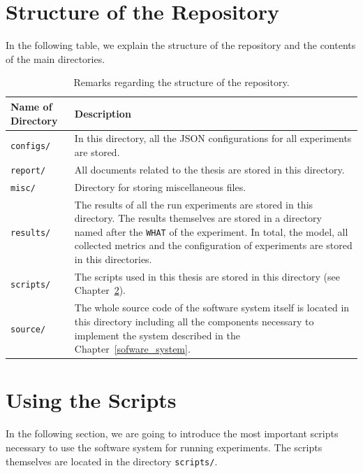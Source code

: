 \clearpage
\section{Structure of the Repository}
In the following table, we explain the structure of the repository and the contents of the main directories.

\begin{table}[H]
	\centering
	\begin{tabularx}{\textwidth}{lX}
		\toprule
		Name of Directory & Description\\ \midrule
		\texttt{configs/} & In this directory, all the JSON configurations for all experiments are stored.\\
		\texttt{report/} & All documents related to the thesis are stored in this directory.\\
		\texttt{misc/} & Directory for storing miscellaneous files.\\
		\texttt{results/} & The results of all the run experiments are stored in this directory. The results themselves are stored in a directory named after the \texttt{WHAT} of the experiment. In total, the model, all collected metrics and the configuration of experiments are stored in this directories.\\
		\texttt{scripts/} & The scripts used in this thesis are stored in this directory (see Chapter~\ref{software_usage:using_scripts}).\\
		\texttt{source/} & The whole source code of the software system itself is located in this directory including all the components necessary to implement the system described in the Chapter~\ref{sofware_system}.\\
		\bottomrule
	\end{tabularx}
	\caption{Remarks regarding the structure of the repository.}
\end{table}

\clearpage
\section{Using the Scripts}
\label{software_usage:using_scripts}
In the following section, we are going to introduce the most important scripts necessary to use the software system for running experiments. The scripts themselves are located in the directory \texttt{scripts/}.

